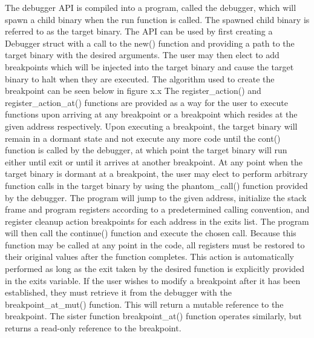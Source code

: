 \documentclass{article}
\begin{document}
The debugger API is compiled into a program, called the debugger, which will spawn a child binary when the run function
is called. The spawned child binary is referred to as the target binary. The API can be used by first creating a
Debugger struct with a call to the new() function and providing a path to the target binary with the desired arguments.
The user may then elect to add breakpoints which will be injected into the target binary and cause the target binary to
halt when they are executed. The algorithm used to create the breakpoint can be seen below in figure x.x The
register\_action() and register\_action\_at() functions are provided as a way for the user to execute functions upon
arriving at any breakpoint or a breakpoint which resides at the given address respectively. Upon executing a breakpoint,
the target binary will remain in a dormant state and not execute any more code until the cont() function is called by
the debugger, at which point the target binary will run either until exit or until it arrives at another breakpoint. At
any point when the target binary is dormant at a breakpoint, the user may elect to perform arbitrary function calls in
the target binary by using the phantom\_call() function provided by the debugger. The program will jump to the given
address, initialize the stack frame and program registers according to a predetermined calling convention, and register
cleanup action breakpoints for each address in the exits list. The program will then call the continue() function and
execute the chosen call. Because this function may be called at any point in the code, all registers must be restored to
their original values after the function completes. This action is automatically performed as long as the exit taken by
the desired function is explicitly provided in the exits variable. If the user wishes to modify a breakpoint after it
has been established, they must retrieve it from the debugger with the breakpoint\_at\_mut() function. This will return
a mutable reference to the breakpoint. The sister function breakpoint\_at() function operates similarly, but returns a
read-only reference to the breakpoint.
\end{document}
